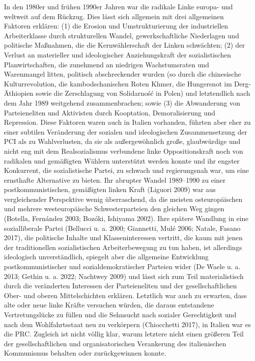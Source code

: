\begin{multicols*}{2}
In den 1980er und frühen 1990er Jahren war die radikale Linke europa- und weltweit auf dem Rückzug. Dies lässt sich allgemein mit drei allgemeinen Faktoren erklären: (1) die Erosion und Umstrukturierung der industriellen Arbeiterklasse durch strukturellen Wandel, gewerkschaftliche Niederlagen und politische Maßnahmen, die die Kernwählerschaft der Linken schwächten; (2) der Verlust an materieller und ideologischer Anziehungskraft der sozialistischen Planwirtschaften, die zunehmend an niedrigen Wachstumsraten und Warenmangel litten, politisch abschreckender wurden (so durch die chinesische Kulturrevolution, die kambodschanischen Roten Khmer, die Hungersnot im Derg-Äthiopien sowie die Zerschlagung von Solidarność in Polen) und letztendlich nach dem Jahr 1989 weitgehend zusammenbrachen; sowie (3) die Abwanderung von Parteieneliten und Aktivisten durch Kooptation, Demoralisierung und Repression. Diese Faktoren waren auch in Italien vorhanden, führten aber eher zu einer subtilen Veränderung der sozialen und ideologischen Zusammensetzung der PCI als zu Wahlverlusten, da sie als außergewöhnlich große, glaubwürdige und nicht eng mit dem Realsozialismus verbundene linke Oppositionskraft noch von radikalen und gemäßigten Wählern unterstützt werden konnte und ihr engster Konkurrent, die sozialistische Partei, zu schwach und regierungsnah war, um eine ernsthafte Alternative zu bieten. Ihr abrupter Wandel 1989–1990 zu einer postkommunistischen, gemäßigten linken Kraft (Liguori 2009) war aus vergleichender Perspektive wenig überraschend, da die meisten osteuropäischen und mehrere westeuropäische Schwesterparteien den gleichen Weg gingen (Botella, Fernández 2003; Bozóki, Ishiyama 2002). Ihre spätere Wandlung in eine sozialliberale Partei (Bellucci u. a. 2000; Giannetti, Mulé 2006; Natale, Fasano 2017), die politische Inhalte und Klasseninteressen vertritt, die kaum mit jenen der traditionellen sozialistischen Arbeiterbewegung zu tun haben, ist allerdings ideologisch unverständlich, spiegelt aber die allgemeine Entwicklung postkommunistischer und sozialdemokratischer Parteien wider (De Waele u. a. 2013; Gethin u. a. 2022; Nachtwey 2009) und lässt sich zum Teil materialistisch durch die veränderten Interessen der Parteieneliten und der gesellschaftlichen Ober- und oberen Mittelschichten erklären. Letztlich war auch zu erwarten, dass alte oder neue linke Kräfte versuchen würden, die daraus entstandene Vertretungslücke zu füllen und die Sehnsucht nach sozialer Gerechtigkeit und nach dem Wohlfahrtsstaat neu zu verkörpern (Chiocchetti 2017), in Italien war es die PRC. Zugleich ist nicht völlig klar, warum letztere nicht einen größeren Teil der gesellschaftlichen und organisatorischen Verankerung des italienischen Kommunismus behalten oder zurückgewinnen konnte.


\end{multicols*}
